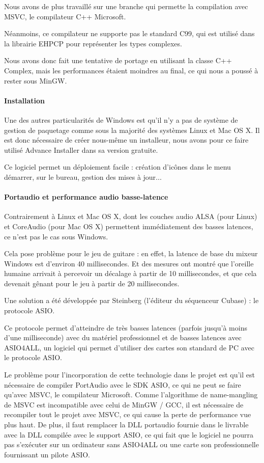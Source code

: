 \documentclass[a4paper,11pt]{article}
\begin{document}
Nous avons de plus travaillé sur une branche qui permette la compilation avec MSVC, le compilateur C++ Microsoft.

Néanmoins, ce compilateur ne supporte pas le standard C99, qui est utilisé dans la librairie EHPCP pour représenter les types complexes.

Nous avons donc fait une tentative de portage en utilisant la classe C++ Complex, mais les performances étaient moindres au final,
ce qui nous a poussé à rester sous MinGW.

\paragraph{Installation}
Une des autres particularités de Windows est qu'il n'y a pas de système de gestion de paquetage comme sous la majorité des systèmes Linux et Mac OS X.
Il est donc nécessaire de créer nous-même un installeur, nous avons pour ce faire utilisé Advance Installer dans sa version gratuite.

Ce logiciel permet un déploiement facile : création d'icônes dans le menu démarrer, sur le bureau, gestion des mises à jour...

\paragraph{Portaudio et performance audio basse-latence}
Contrairement à Linux et Mac OS X, dont les couches audio ALSA (pour Linux) et CoreAudio (pour Mac OS X) permettent immédiatement
des basses latences, ce n'est pas le cas sous Windows.

Cela pose problème pour le jeu de guitare : en effet, la latence de base du mixeur Windows est d'environ 40 millisecondes.
Et des mesures ont montré que l'oreille humaine arrivait à percevoir un décalage à partir de 10 millisecondes, et que cela devenait gênant pour le jeu à partir de 20 millisecondes.

Une solution a été développée par Steinberg (l'éditeur du séquenceur Cubase) : le protocole ASIO.

Ce protocole permet d'atteindre de très basses latences (parfois jusqu'à moins d'une milliseconde) avec
du matériel professionnel et de basses latences avec ASIO4ALL, un logiciel qui permet d'utiliser des cartes son standard de PC avec le protocole ASIO.

Le problème pour l'incorporation de cette technologie dans le projet est qu'il est nécessaire de compiler PortAudio avec le SDK ASIO, ce qui
ne peut se faire qu'avec MSVC, le compilateur Microsoft.
Comme l'algorithme de name-mangling de MSVC est incompatible avec celui de MinGW / GCC, il est nécessaire de recompiler tout le projet avec MSVC, ce qui cause la perte de performance vue plus haut.
De plus, il faut remplacer la DLL portaudio fournie dans le livrable avec la DLL compilée avec le support ASIO, ce qui fait
que le logiciel ne pourra pas s'exécuter sur un ordinateur sans ASIO4ALL ou une carte son professionnelle fournissant un pilote ASIO.
\end{document}
